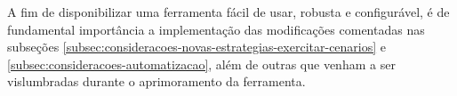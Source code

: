A fim de disponibilizar uma ferramenta fácil de usar, robusta e configurável, é de fundamental importância a implementação das modificações comentadas nas subseções \ref{subsec:consideracoes-novas-estrategias-exercitar-cenarios} e \ref{subsec:consideracoes-automatizacao}, além de outras que venham a ser vislumbradas durante o aprimoramento da ferramenta.